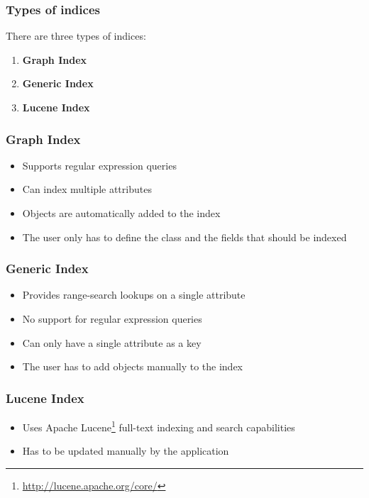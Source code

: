 
\begin{frame}
\frametitle{Types of indices}
There are three types of indices:

\begin{enumerate}
	\item \textbf{Graph Index}
	\item \textbf{Generic Index}
	\item \textbf{Lucene Index}
\end{enumerate}
\end{frame}

\begin{frame}
\frametitle{Graph Index}
\begin{itemize}
	\pause
	\item Supports regular expression queries \pause
	\item Can index multiple attributes \pause
	\item Objects are automatically added to the index \pause
	\item The user only has to define the class and the fields that should be indexed
\end{itemize}
\end{frame}

\begin{frame}
\frametitle{Generic Index}
\begin{itemize}
	\pause
	\item Provides range-search lookups on a single attribute \pause
	\item No support for regular expression queries \pause
	\item Can only have a single attribute as a key \pause
	\item The user has to add objects manually to the index
\end{itemize}
\end{frame}

\begin{frame}
\frametitle{Lucene Index}
\begin{itemize}
	\item Uses Apache Lucene\footnote{\url{http://lucene.apache.org/core/}} full-text indexing and search capabilities
	\item Has to be updated manually by the application
\end{itemize}
\end{frame}